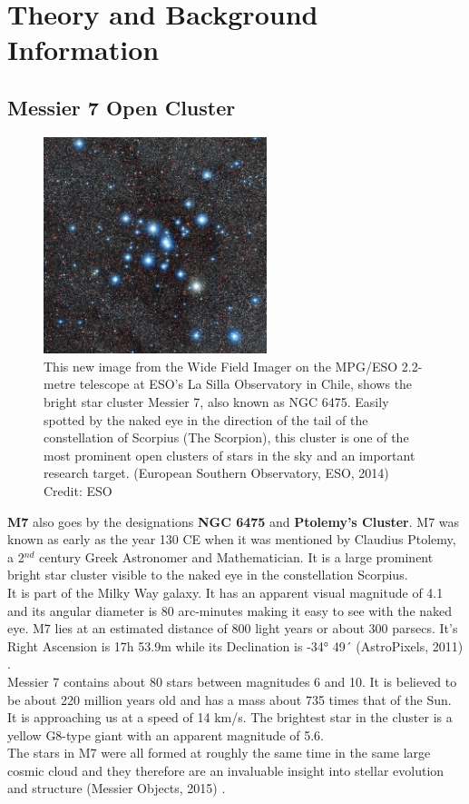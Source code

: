 \documentclass[12pt]{article}
\begin{document}
	
	
	\section{Theory and Background Information}
		\subsection{Messier 7 Open Cluster}
		\begin{figure}
			\includegraphics[width=0.58\textwidth]{m7_eso_0}
			\caption{This new image from the Wide Field Imager on the MPG/ESO 2.2-metre telescope at ESO’s La Silla Observatory in Chile, shows the bright star cluster Messier 7, also known as NGC 6475. Easily spotted by the naked eye in the direction of the tail of the constellation of Scorpius (The Scorpion), this cluster is one of the most prominent open clusters of stars in the sky and an important research target. (European Southern Observatory, ESO, 2014) \cite{eso_m7} Credit: ESO}
			\label{fig: m7}
		\end{figure}
		\textbf{M7} also goes by the designations \textbf{NGC 6475} and \textbf{Ptolemy's Cluster}. M7 was known as early as the year 130 CE when it was mentioned by Claudius Ptolemy, a 2$^{nd}$ century Greek Astronomer and Mathematician. It is a large prominent bright star cluster visible to the naked eye in the constellation Scorpius.\\
		It is part of the Milky Way galaxy. It has an apparent visual magnitude of 4.1 and its angular diameter is 80 arc-minutes making it easy to see with the naked eye. M7 lies at an estimated distance of 800 light years or about 300 parsecs. It's Right Ascension is 17h 53.9m while its Declination is -34° 49´ (AstroPixels, 2011) \cite{astropixels_m7}.\\
		Messier 7 contains about 80 stars between magnitudes 6 and 10. It is believed to be about 220 million years old and has a mass about 735 times that of the Sun. It is approaching us at a speed of 14 km/s. The brightest star in the cluster is a yellow G8-type giant with an apparent magnitude of 5.6.\\
		The stars in M7 were all formed at roughly the same time in the same large cosmic cloud and they therefore are an invaluable insight into stellar evolution and structure (Messier Objects, 2015) \cite{messier007}.\\
\end{document}
